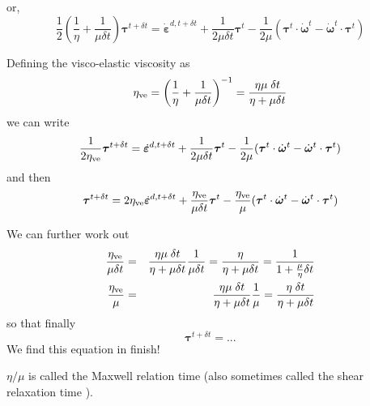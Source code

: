 or, 
\[
\frac12
\left(\frac{1}{\eta} + \frac{1}{\mu\delta t} \right){\bm \tau}^{t+\delta t} 
= \dot{\bm \varepsilon}^{d,t+\delta t} 
+ \frac{1}{2 \mu\delta t}  {\bm\tau}^t
- \frac{1}{2 \mu} ( {\bm \tau}^t\cdot \dot{\bm \omega}^t - \dot{\bm \omega}^t \cdot {\bm \tau}^t)
\]

Defining the visco-elastic viscosity as  
\[
\eta_{\rm ve} 
= \left( \frac{1}{\eta} + \frac{1}{\mu \delta t} \right)^{-1}
= \frac{\eta\mu \; \delta t}{\eta + \mu \delta t}
\]
we can write
\[
\frac{1}{2\eta_{\rm ve}} {\bm \tau}^{t+\delta t} 
= \dot{\bm \varepsilon}^{d,t+\delta t} 
+ \frac{1}{2 \mu\delta t}  {\bm\tau}^t
- \frac{1}{2 \mu} ( {\bm \tau}^t\cdot \dot{\bm \omega}^t - \dot{\bm \omega}^t \cdot {\bm \tau}^t)
\]
and then 
\[
{\bm \tau}^{t+\delta t} 
= 2 \eta_{\rm ve}\dot{\bm \varepsilon}^{d,t+\delta t} 
+ \frac{\eta_{\rm ve} }{\mu\delta t}  {\bm\tau}^t
- \frac{\eta_{\rm ve} }{\mu} ( {\bm \tau}^t\cdot \dot{\bm \omega}^t - \dot{\bm \omega}^t \cdot {\bm \tau}^t)
\]

We can further work out
\begin{eqnarray}
\frac{\eta_{\rm ve} }{ \mu\delta t} 
&=& \frac{\eta\mu \; \delta t}{\eta + \mu \delta t} \frac{1 }{ \mu\delta t} 
= \frac{\eta }{\eta + \mu \delta t} 
= \frac{1 }{1 + \frac{\mu}{\eta} \delta t}
\nonumber\\ 
\frac{\eta_{\rm ve} }{\mu}
&=&
\frac{\eta\mu \; \delta t}{\eta + \mu \delta t} \frac{1 }{\mu} 
= \frac{\eta \; \delta t}{\eta + \mu \delta t} 
\end{eqnarray}
so that finally
\[
{\bm \tau}^{t+\delta t} = ...
\]
We find this equation in \cite{modm02}
{\color{red} finish!}

$\eta/\mu$ is called the Maxwell relation time (also sometimes called the shear relaxation time \cite{modm02}).




